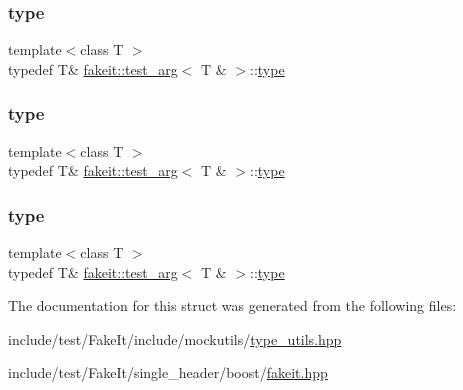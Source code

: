 \subsubsection{\texorpdfstring{type}{type}\hspace{0.1cm}{\footnotesize\ttfamily [7/9]}}
{\footnotesize\ttfamily template$<$class T $>$ \\
typedef T\& \mbox{\hyperlink{structfakeit_1_1test__arg}{fakeit\+::test\+\_\+arg}}$<$ T \& $>$\+::\mbox{\hyperlink{structfakeit_1_1test__arg_3_01T_01_6_01_4_a76c42a4147d9060cc475b5496393cec4}{type}}}

\mbox{\label{structfakeit_1_1test__arg_3_01T_01_6_01_4_a76c42a4147d9060cc475b5496393cec4}} 
\subsubsection{\texorpdfstring{type}{type}\hspace{0.1cm}{\footnotesize\ttfamily [8/9]}}
{\footnotesize\ttfamily template$<$class T $>$ \\
typedef T\& \mbox{\hyperlink{structfakeit_1_1test__arg}{fakeit\+::test\+\_\+arg}}$<$ T \& $>$\+::\mbox{\hyperlink{structfakeit_1_1test__arg_3_01T_01_6_01_4_a76c42a4147d9060cc475b5496393cec4}{type}}}

\mbox{\label{structfakeit_1_1test__arg_3_01T_01_6_01_4_a76c42a4147d9060cc475b5496393cec4}} 
\subsubsection{\texorpdfstring{type}{type}\hspace{0.1cm}{\footnotesize\ttfamily [9/9]}}
{\footnotesize\ttfamily template$<$class T $>$ \\
typedef T\& \mbox{\hyperlink{structfakeit_1_1test__arg}{fakeit\+::test\+\_\+arg}}$<$ T \& $>$\+::\mbox{\hyperlink{structfakeit_1_1test__arg_3_01T_01_6_01_4_a76c42a4147d9060cc475b5496393cec4}{type}}}



The documentation for this struct was generated from the following files\+:\begin{DoxyCompactItemize}
\item 
include/test/\+Fake\+It/include/mockutils/\mbox{\hyperlink{type__utils_8hpp}{type\+\_\+utils.\+hpp}}\item 
include/test/\+Fake\+It/single\+\_\+header/boost/\mbox{\hyperlink{single__header_2boost_2fakeit_8hpp}{fakeit.\+hpp}}\end{DoxyCompactItemize}
